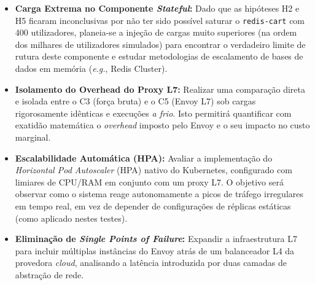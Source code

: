 \documentclass[manuscript,oneside]{acmart}
\begin{document}
\begin{itemize}
    \item \textbf{Carga Extrema no Componente \textit{Stateful}:} Dado que as hipóteses H2 e H5 ficaram inconclusivas por não ter sido possível saturar o \texttt{redis-cart} com 400 utilizadores, planeia-se a injeção de cargas muito superiores (na ordem dos milhares de utilizadores simulados) para encontrar o verdadeiro limite de rutura deste componente e estudar metodologias de escalamento de bases de dados em memória (\textit{e.g.}, Redis Cluster).
    \item \textbf{Isolamento do Overhead do Proxy L7:} Realizar uma comparação direta e isolada entre o C3 (força bruta) e o C5 (Envoy L7) sob cargas rigorosamente idênticas e execuções \textit{a frio}. Isto permitirá quantificar com exatidão matemática o \textit{overhead} imposto pelo Envoy e o seu impacto no custo marginal.
    \item \textbf{Escalabilidade Automática (HPA):} Avaliar a implementação do \textit{Horizontal Pod Autoscaler} (HPA) nativo do Kubernetes, configurado com limiares de CPU/RAM em conjunto com um proxy L7. O objetivo será observar como o sistema reage autonomamente a picos de tráfego irregulares em tempo real, em vez de depender de configurações de réplicas estáticas (como aplicado nestes testes).
    \item \textbf{Eliminação de \textit{Single Points of Failure}:} Expandir a infraestrutura L7 para incluir múltiplas instâncias do Envoy atrás de um balanceador L4 da provedora \textit{cloud}, analisando a latência introduzida por duas camadas de abstração de rede.
\end{itemize}
\end{document}
